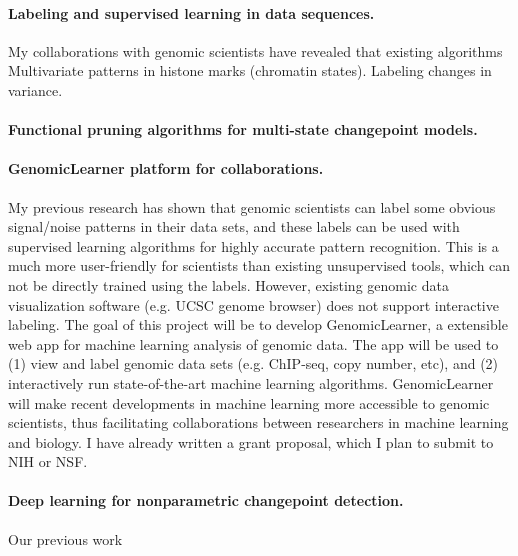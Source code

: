 \documentclass{article}
\begin{document}
\paragraph{Labeling and supervised learning in data sequences.} My
collaborations with genomic scientists have revealed that existing
algorithms Multivariate patterns in histone marks (chromatin
states). Labeling changes in variance.

\paragraph{Functional pruning algorithms for multi-state changepoint
  models.}

\paragraph{GenomicLearner platform for collaborations.} My previous
research has shown that genomic scientists can label some obvious
signal/noise patterns in their data sets, and these labels can be used
with supervised learning algorithms for highly accurate pattern
recognition. This is a much more user-friendly for scientists than
existing unsupervised tools, which can not be directly trained using
the labels. However, existing genomic data visualization software
(e.g. UCSC genome browser) does not support interactive labeling. The
goal of this project will be to develop GenomicLearner, a extensible
web app for machine learning analysis of genomic data. The app will be
used to (1) view and label genomic data sets (e.g. ChIP-seq, copy
number, etc), and (2) interactively run state-of-the-art machine
learning algorithms. GenomicLearner will make recent developments in
machine learning more accessible to genomic scientists, thus
facilitating collaborations between researchers in machine learning
and biology. I have already written a grant proposal, which I plan to
submit to NIH or NSF.

\paragraph{Deep learning for nonparametric changepoint detection.} Our
previous work



\end{document}
